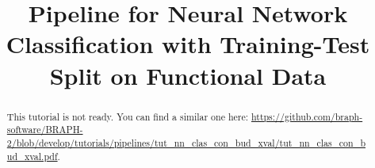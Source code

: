 \documentclass[justified]{tufte-handout}
\title[Classification Training-Test Split Functional Data]{Pipeline for Neural Network Classification with Training-Test Split on Functional Data}
\begin{document}
\maketitle

\begin{abstract}
\noindent
This tutorial is not ready. You can find a similar one here: \url{https://github.com/braph-software/BRAPH-2/blob/develop/tutorials/pipelines/tut_nn_clas_con_bud_xval/tut_nn_clas_con_bud_xval.pdf}.
\end{abstract}
\end{document}
